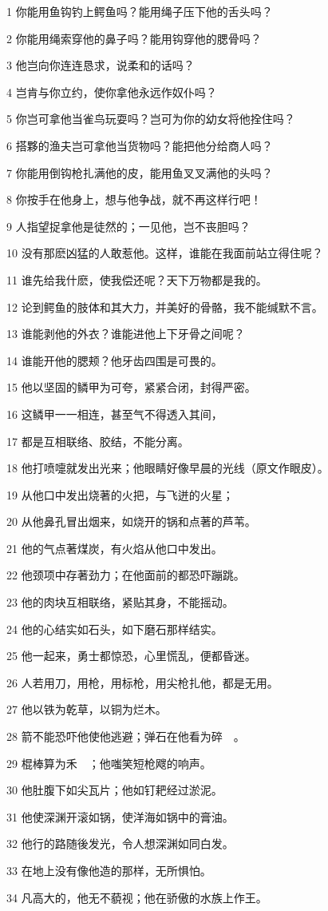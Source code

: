 \par 1 你能用鱼钩钓上鳄鱼吗？能用绳子压下他的舌头吗？
\par 2 你能用绳索穿他的鼻子吗？能用钩穿他的腮骨吗？
\par 3 他岂向你连连恳求，说柔和的话吗？
\par 4 岂肯与你立约，使你拿他永远作奴仆吗？
\par 5 你岂可拿他当雀鸟玩耍吗？岂可为你的幼女将他拴住吗？
\par 6 搭夥的渔夫岂可拿他当货物吗？能把他分给商人吗？
\par 7 你能用倒钩枪扎满他的皮，能用鱼叉叉满他的头吗？
\par 8 你按手在他身上，想与他争战，就不再这样行吧！
\par 9 人指望捉拿他是徒然的；一见他，岂不丧胆吗？
\par 10 没有那麽凶猛的人敢惹他。这样，谁能在我面前站立得住呢？
\par 11 谁先给我什麽，使我偿还呢？天下万物都是我的。
\par 12 论到鳄鱼的肢体和其大力，并美好的骨骼，我不能缄默不言。
\par 13 谁能剥他的外衣？谁能进他上下牙骨之间呢？
\par 14 谁能开他的腮颊？他牙齿四围是可畏的。
\par 15 他以坚固的鳞甲为可夸，紧紧合闭，封得严密。
\par 16 这鳞甲一一相连，甚至气不得透入其间，
\par 17 都是互相联络、胶结，不能分离。
\par 18 他打喷嚏就发出光来；他眼睛好像早晨的光线（原文作眼皮）。
\par 19 从他口中发出烧著的火把，与飞迸的火星；
\par 20 从他鼻孔冒出烟来，如烧开的锅和点著的芦苇。
\par 21 他的气点著煤炭，有火焰从他口中发出。
\par 22 他颈项中存著劲力；在他面前的都恐吓蹦跳。
\par 23 他的肉块互相联络，紧贴其身，不能摇动。
\par 24 他的心结实如石头，如下磨石那样结实。
\par 25 他一起来，勇士都惊恐，心里慌乱，便都昏迷。
\par 26 人若用刀，用枪，用标枪，用尖枪扎他，都是无用。
\par 27 他以铁为乾草，以铜为烂木。
\par 28 箭不能恐吓他使他逃避；弹石在他看为碎　。
\par 29 棍棒算为禾　；他嗤笑短枪飕的响声。
\par 30 他肚腹下如尖瓦片；他如钉耙经过淤泥。
\par 31 他使深渊开滚如锅，使洋海如锅中的膏油。
\par 32 他行的路随後发光，令人想深渊如同白发。
\par 33 在地上没有像他造的那样，无所惧怕。
\par 34 凡高大的，他无不藐视；他在骄傲的水族上作王。


